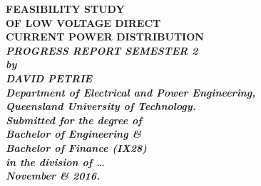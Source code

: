 \begin{titlepage}
\renewcommand{\baselinestretch}{1.0}
\begin{center}
\vspace*{35mm}
\Huge\bf
		FEASIBILITY STUDY\\
		OF LOW VOLTAGE DIRECT\\
		CURRENT POWER DISTRIBUTION\\
\vspace{7mm}
\large\sl\bf
		PROGRESS REPORT SEMESTER 2\\
\vspace{15mm}
\large\sl
		by\\
		DAVID PETRIE
		\medskip\\
\rm
		Department of Electrical and Power Engineering,\\
		Queensland University of Technology.\\
\vspace{30mm}
		Submitted for the degree of\\
		Bachelor of Engineering \& \\
		Bachelor of Finance (IX28)
		\smallskip\\ [2cm]
\normalsize
		in the division of \ldots
		\medskip\\
\large
		November \& 2016.		
\end{center}
\end{titlepage}